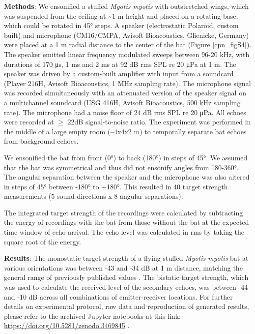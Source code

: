 \documentclass[
]{book}
\begin{document}
\textbf{Methods}: We ensonified a stuffed \emph{Myotis myotis} with outstretched wings, which was suspended from the ceiling at \textasciitilde1 m height and placed on a rotating base, which could be rotated in 45° steps. A speaker (electrostatic Polaroid, custom built) and microphone (CM16/CMPA, Avisoft Bioacoustics, Glienicke, Germany) were placed at a 1 m radial distance to the center of the bat (Figure \ref{cpn_figS4}). The speaker emitted linear frequency modulated sweeps between 96-20 kHz, with durations of 170 μs, 1 ms and 2 ms at 92 dB rms SPL re 20 μPa at 1 m. The speaker was driven by a custom-built amplifier with input from a soundcard (Player 216H, Avisoft Bioacoustics, 1 MHz sampling rate). The microphone signal was recorded simultaneously with an attenuated version of the speaker signal on a multichannel soundcard (USG 416H, Avisoft Bioacoustics, 500 kHz sampling rate). The microphone had a noise floor of 24 dB rms SPL re 20 μPa. All echoes were recorded at \(\geq\) 22dB signal-to-noise ratio. The experiment was performed in the middle of a large empty room (\textasciitilde4x4x2 m) to temporally separate bat echoes from background echoes.

We ensonified the bat from front (0°) to back (180°) in steps of 45°. We assumed
that the bat was symmetrical and thus did not ensonify angles from 180-360°. The
angular separation between the speaker and the microphone was also altered in
steps of 45° between -180° to +180°. This resulted in 40 target strength
measurements (5 sound directions x 8 angular separations).

The integrated target strength \citep{j1985a} of the recordings were calculated by subtracting the energy of recordings with the bat from those without the bat at the expected time window of echo arrival. The echo level was calculated in rms by taking the square root of the energy.

\textbf{Results}: The monostatic target strength of a flying stuffed \emph{Myotis myotis} bat at various orientations was between -43 and -34 dB at 1 m distance, matching the general range of previously published values \citep{goetze2016a}. The bistatic target strength, which was used to calculate the received level of the secondary echoes, was between -44 and -10 dB across all combinations of emitter-receiver locations. For further details on experimental protocol, raw data and reproduction of generated results, please refer to the archived Jupyter notebooks at this link: \url{https://doi.org/10.5281/zenodo.3469845} .
\end{document}
